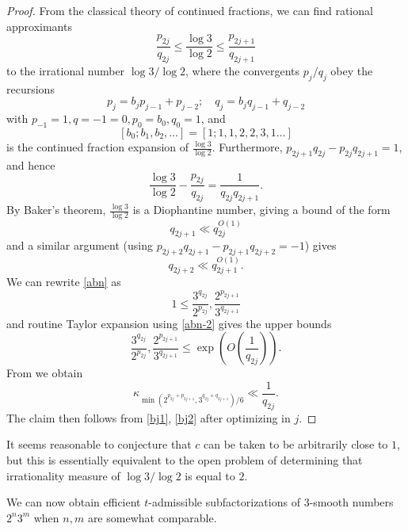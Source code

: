 \documentclass[12pt,a4paper,reqno]{amsart}
\numberwithin{equation}{section}
\theoremstyle{plain}
\theoremstyle{definition}
\begin{document}
\begin{proof}  From the classical theory of continued fractions, we can find rational approximants
\begin{equation}\label{abn}
 \frac{p_{2j}}{q_{2j}} \leq \frac{\log 3}{\log 2} \leq \frac{p_{2j+1}}{q_{2j+1}}
\end{equation}
to the irrational number $\log 3/\log 2$, where the convergents $p_j/q_j$ obey the recursions
$$ p_j = b_j p_{j-1} + p_{j-2}; \quad q_j = b_j q_{j-1} + q_{j-2}$$
with $p_{-1} = 1, q={-1}=0, p_0 = b_0, q_0=1$, and 
$$[b_0;b_1,b_2,\dots] = [1;1,1,2,2,3,1\dots]$$ 
is the continued fraction expansion of $\frac{\log 3}{\log 2}$.  Furthermore, $p_{2j+1}q_{2j} - p_{2j} q_{2j+1} = 1$, and hence
\begin{equation}\label{abn-2} 
  \frac{\log 3}{\log 2} - \frac{p_{2j}}{q_{2j}} = \frac{1}{q_{2j} q_{2j+1}}.
\end{equation}
By Baker's theorem, $\frac{\log 3}{\log 2}$ is a Diophantine number, giving a bound of the form
\begin{equation}\label{bj1}
   q_{2j+1} \ll q_{2j}^{O(1)}
\end{equation}
and a similar argument (using $p_{2j+2} q_{2j+1}-p_{2j+1} q_{2j+2} = -1$) gives
\begin{equation}\label{bj2}
 q_{2j+2} \ll q_{2j+1}^{O(1)}.
\end{equation}
We can rewrite \eqref{abn} as
$$ 1 \leq \frac{3^{q_{2j}}}{2^{p_{2j}}}, \frac{2^{p_{2j+1}}}{3^{q_{2j+1}}}$$
and routine Taylor expansion using \eqref{abn-2} gives the upper bounds
$$ \frac{3^{q_{2j}}}{2^{p_{2j}}}, \frac{2^{p_{2j+1}}}{3^{q_{2j+1}}}\leq \exp\left( O\left( \frac{1}{q_{2j}}\right)\right).$$
From  we obtain
$$
\kappa_{\min(2^{p_{2j} + p_{2j+1}}, 3^{q_{2j}+q_{2j+1}})/6} \ll \frac{1}{q_{2j}}.$$
The claim then follows from \eqref{bj1}, \eqref{bj2} after optimizing in $j$.

\end{proof}


It seems reasonable to conjecture that $c$ can be taken to be arbitrarily close to $1$, but this is essentially equivalent to the open problem of determining that irrationality measure of $\log 3 / \log 2$ is equal to $2$.

We can now obtain efficient $t$-admissible subfactorizations of $3$-smooth numbers $2^n 3^m$ when $n,m$ are somewhat comparable.
\end{document}

